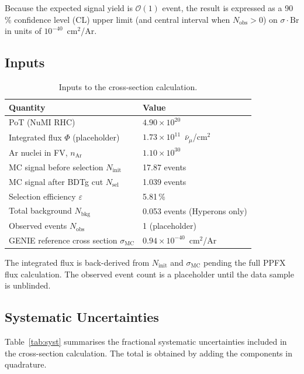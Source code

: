 \documentclass[12pt,a4paper]{article}
\begin{document}
Because the expected signal yield is $\mathcal{O}(1)$ event, the
result is expressed as a 90\,\% confidence level (CL) upper limit
(and central interval when $N_\text{obs} > 0$) on
$\sigma \cdot \text{Br}$ in units of $10^{-40}$~cm$^2$/Ar.

\subsection{Inputs}

\begin{table}[H]
  \centering
  \caption{Inputs to the cross-section calculation.}
  \label{tab:xsec_inputs}
  \begin{tabular}{ll}
    \toprule
    Quantity & Value \\
    \midrule
    PoT (NuMI RHC)                               & $4.90 \times 10^{20}$ \\
    Integrated flux $\Phi$ (placeholder)         & $1.73 \times 10^{11}$~$\bar\nu_\mu$/cm$^2$ \\
    Ar nuclei in FV, $n_\text{Ar}$               & $1.10 \times 10^{30}$ \\
    MC signal before selection $N_\text{init}$   & 17.87 events \\
    MC signal after BDTg cut $N_\text{sel}$      & 1.039 events \\
    Selection efficiency $\varepsilon$           & 5.81\,\% \\
    Total background $N_\text{bkg}$              & 0.053 events (Hyperons only) \\
    Observed events $N_\text{obs}$               & 1 (placeholder) \\
    GENIE reference cross section $\sigma_\text{MC}$ & $0.94 \times 10^{-40}$~cm$^2$/Ar \\
    \bottomrule
  \end{tabular}
\end{table}

The integrated flux is back-derived from $N_\text{init}$ and
$\sigma_\text{MC}$ pending the full PPFX flux calculation.
The observed event count is a placeholder until the data sample
is unblinded.

\subsection{Systematic Uncertainties}

Table~\ref{tab:syst} summarises the fractional systematic uncertainties
included in the cross-section calculation.  The total is obtained by
adding the components in quadrature.
\end{document}
